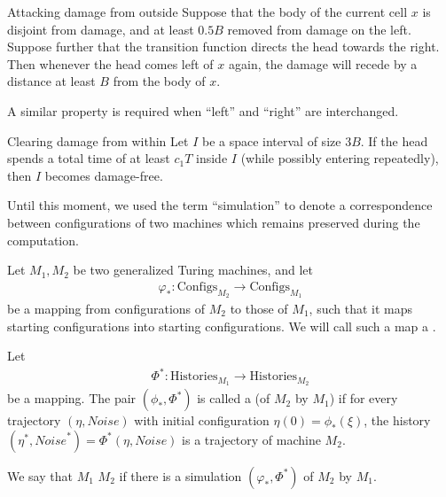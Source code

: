 \documentclass[12pt]{memoir}
\renewcommand{\B}{B}
\newcommand{\Configs}{\mathrm{Configs}}
\newcommand{\Noise}{\mathit{Noise}}
\newcommand{\Tu}{T}
\newcommand{\Histories}{\mathrm{Histories}}
\begin{document}
\begin{definition}[Trajectory]
\begin{flushdescription}
\item[Attacking damage from outside] \label{i:def.traj.attack-from-outside}
Suppose that the body of the current cell $x$ is disjoint from damage, 
and at least $0.5\B$ removed from damage on the left.
Suppose further that the transition function directs the head towards the right.
Then whenever the head comes left  of \( x \) again, the  
damage will recede by a distance at least \( \B \) from the body of \( x \).

A similar property is required when ``left'' and ``right'' are interchanged.

\item[Clearing damage from within] \label{i:def.traj.damage-within}
Let $ I $ be a space interval of size $ 3\B $.
If the head spends a total time of at least $ c_{1}\Tu $ inside $ I $ (while possibly
entering repeatedly), then $ I $ becomes damage-free.

\end{flushdescription}
\end{definition}


Until this moment, we used the term ``simulation'' to denote
a correspondence between configurations of
two machines which remains preserved during the computation.


\begin{definition}[Simulation] \label{def:simulation-central}
Let $M_{1},M_{2}$ be two generalized Turing machines, and let
\begin{align*}
    \varphi_{*}:\Configs_{M_{2}} \to \Configs_{M_{1}}
\end{align*}
be a mapping from configurations of $M_{2}$
to those of $M_{1}$, such that it maps
starting configurations into starting configurations.
We will call such a map a .

Let
\begin{align*}
   \Phi^{*}:\Histories_{M_{1}} \to \Histories_{M_{2}}
\end{align*}
be a mapping.
The pair $(\phi_{*}, \Phi^{*}) $
is called a  (of $ M_{2} $ by $ M_{1} $) if for every
trajectory $ (\eta, \Noise) $ with initial
configuration $ \eta(0)=\phi_{*}(\xi) $,
the history $ (\eta^{*},\Noise^{*})=\Phi^{*}(\eta,\Noise) $ is
a trajectory of machine $ M_{2} $.

We say that $M_{1}$  $M_{2}$ if there is a simulation
$(\varphi_{*},\Phi^{*})$ of $M_{2}$ by $M_{1}$.
\end{definition}
\end{document}
